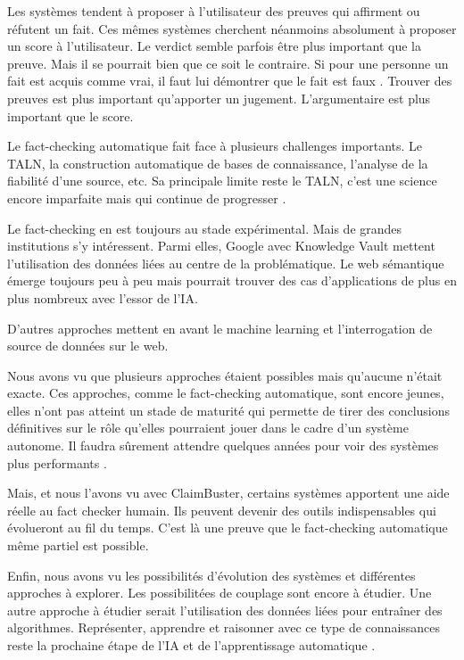 Les systèmes tendent à proposer à l'utilisateur des preuves qui affirment ou réfutent un fait. Ces mêmes systèmes cherchent néanmoins absolument à proposer un score à l'utilisateur. Le verdict semble parfois être plus important que la preuve. Mais il se pourrait bien que ce soit le contraire. Si pour une personne un fait est acquis comme vrai, il faut lui démontrer que le fait est faux \cite{cobb2013beliefs}. Trouver des preuves est plus important qu'apporter un jugement. L'argumentaire est plus important que le score.

Le fact-checking automatique fait face à plusieurs challenges importants. Le TALN, la construction automatique de bases de connaissance, l'analyse de la fiabilité d'une source, etc. Sa principale limite reste le TALN, c'est une science encore imparfaite mais qui continue de progresser \cite{jozefowicz2016exploring}. 

Le fact-checking en est toujours au stade expérimental. Mais de grandes institutions s'y intéressent. Parmi elles, Google avec Knowledge Vault mettent l'utilisation des données liées au centre de la problématique. Le web sémantique émerge toujours peu à peu mais pourrait trouver des cas d'applications de plus en plus nombreux avec l'essor de l'IA.

D'autres approches mettent en avant le machine learning et l'interrogation de source de données sur le web.

Nous avons vu que plusieurs approches étaient possibles mais qu'aucune n'était exacte. Ces approches, comme le fact-checking automatique, sont encore jeunes, elles n'ont pas atteint un stade de maturité qui permette de tirer des conclusions définitives sur le rôle qu'elles pourraient jouer dans le cadre d'un système autonome. Il faudra sûrement attendre quelques années pour voir des systèmes plus performants \cite{gravesfactsheet}.

Mais, et nous l'avons vu avec ClaimBuster, certains systèmes apportent une aide réelle au fact checker humain. Ils peuvent devenir des outils indispensables qui évolueront au fil du temps. C'est là une preuve que le fact-checking automatique même partiel est possible.

Enfin, nous avons vu les possibilités d'évolution des systèmes et différentes approches à explorer. Les possibilitées de couplage sont encore à étudier. Une autre approche à étudier serait l'utilisation des données liées pour entraîner des algorithmes. Représenter, apprendre et raisonner avec ce type de connaissances reste la prochaine étape de l'IA et de l'apprentissage automatique \cite{nickel2016review}.
